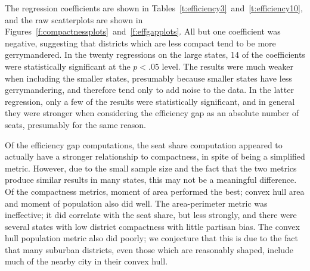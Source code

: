 \documentclass[12pt]{article}
\begin{document}
  The regression coefficients are shown in Tables~\ref{t:efficiency3}~and~\ref{t:efficiency10}, and the raw scatterplots are shown in Figures~\ref{f:compactnessplots}~and~\ref{f:effgapplots}.  All but one coefficient was negative, suggesting that districts which are less compact tend to be more gerrymandered.  In the twenty regressions on the large states, 14 of the coefficients were statistically significant at the $p<.05$ level.  The results were much weaker when including the smaller states, presumably because smaller states have less gerrymandering, and therefore tend only to add noise to the data.  In the latter regression, only a few of the results were statistically significant, and in general they were stronger when considering the efficiency gap as an absolute number of seats, presumably for the same reason.

  Of the efficiency gap computations, the seat share computation appeared to actually have a stronger relationship to compactness, in spite of being a simplified metric.  However, due to the small sample size and the fact that the two metrics produce similar results in many states, this may not be a meaningful difference.  Of the compactness metrics, moment of area performed the best; convex hull area and moment of population also did well.  The area-perimeter metric was ineffective; it did correlate with the seat share, but less strongly, and there were several states with low district compactness with little partisan bias.  The convex hull population metric also did poorly; we conjecture that this is due to the fact that many suburban districts, even those which are reasonably shaped, include much of the nearby city in their convex hull.
\end{document}
